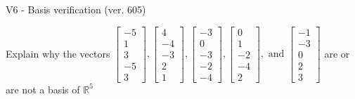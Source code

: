 \begin{exercise}
  \begin{exerciseTitle}V6 - Basis verification (ver. 605)\end{exerciseTitle}
  \begin{exerciseStatement}
    Explain why the vectors \(\left[\begin{array}{r}
-5 \\
1 \\
3 \\
-5 \\
3
\end{array}\right] , \left[\begin{array}{r}
4 \\
-4 \\
-3 \\
2 \\
1
\end{array}\right] , \left[\begin{array}{r}
-3 \\
0 \\
-3 \\
-2 \\
-4
\end{array}\right] , \left[\begin{array}{r}
0 \\
1 \\
-2 \\
-4 \\
2
\end{array}\right] , \text{ and } \left[\begin{array}{r}
-1 \\
-3 \\
0 \\
2 \\
3
\end{array}\right]\) are or are not a basis of \(\mathbb{R}^5\)	



\end{exerciseStatement}
\end{exercise}
